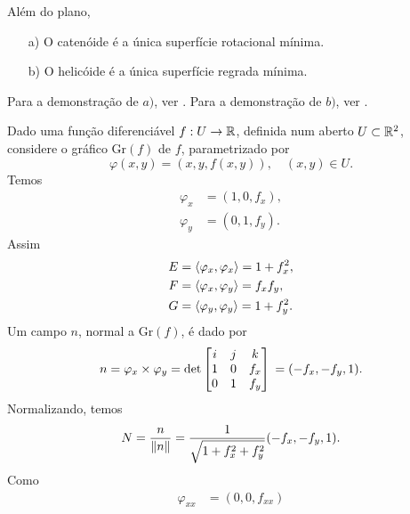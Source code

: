 \begin{teorema}
	Além do plano,
	\begin{enumerate}
		\item[a)] O catenóide é a única superfície rotacional mínima.
		\item[b)] O helicóide é a única superfície regrada mínima.
	\end{enumerate}
\end{teorema}

\begin{demonstracao}
	Para a demonstração de $a)$, ver \cite[§3.5, Exemplo 5]{Carmo2010}. 
	Para a demonstração de $b)$, ver \cite[§3.5, Exemplo 6]{Carmo2010}.
\end{demonstracao}

\begin{exemplo}
	Dado uma função diferenciável $f: U \rightarrow \mathbb{R}$, definida num aberto $U \subset \mathbb{R}^2$, considere o gráfico $\text{Gr}(f)$ de $f$, parametrizado por
	\begin{equation*}
	\varphi(x,y) = (x,y,f(x,y)), \quad (x,y) \in U.
	\end{equation*}
	Temos
	\begin{align*}
	\varphi_x &= (1,0,f_x),\\
	\varphi_y &= (0,1,f_y).
	\end{align*}
	Assim
	\begin{align*}
	E &= \left\langle \varphi_x,\varphi_x \right\rangle = 1 + f_x^2,\\
	F &= \left\langle \varphi_x,\varphi_y \right\rangle = f_x f_y,\\
	G &= \left\langle \varphi_y,\varphi_y \right\rangle = 1 + f_y^2.
	\end{align*}
	Um campo $n$, normal a $\text{Gr}(f)$, é dado por
	\begin{equation*}
	n = \varphi_x \times \varphi_y = \det \left[ \begin{matrix}
	i & j & k\\
	1 & 0 & f_x\\
	0 & 1 & f_y
	\end{matrix} \right]\\
	= (-f_x, -f_y, 1).
	\end{equation*}
	Normalizando, temos
	\begin{equation*}
	N = \frac{n}{\left\| n \right\|} = \frac{1}{\sqrt{1 + f_x^2 + f_y^2}}(-f_x, -f_y, 1).
	\end{equation*}
	Como
	\begin{align*}
	\varphi_{xx} &= (0, 0, f_{xx})\\

\end{align*}
\end{exemplo}
